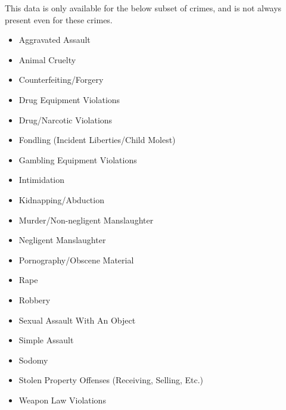 \documentclass[
]{krantz}
\providecommand{\tightlist}{%
  \setlength{\itemsep}{0pt}\setlength{\parskip}{0pt}}
\begin{document}
This data is only available for the below subset of crimes,
and is not always present even for these crimes.

\begin{itemize}
\tightlist
\item
  Aggravated Assault
\item
  Animal Cruelty
\item
  Counterfeiting/Forgery
\item
  Drug Equipment Violations
\item
  Drug/Narcotic Violations
\item
  Fondling (Incident Liberties/Child Molest)
\item
  Gambling Equipment Violations
\item
  Intimidation
\item
  Kidnapping/Abduction
\item
  Murder/Non-negligent Manslaughter
\item
  Negligent Manslaughter
\item
  Pornography/Obscene Material
\item
  Rape
\item
  Robbery
\item
  Sexual Assault With An Object
\item
  Simple Assault
\item
  Sodomy
\item
  Stolen Property Offenses (Receiving, Selling, Etc.)
\item
  Weapon Law Violations
\end{itemize}
\end{document}
